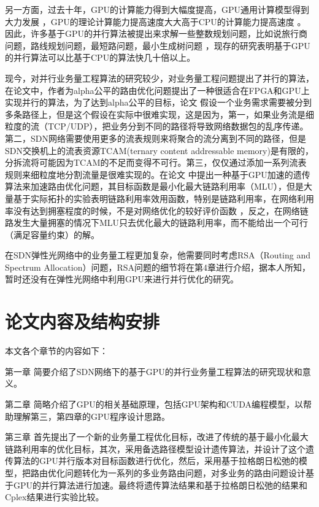 \documentclass[master]{thesis-uestc}
\begin{document}
另一方面，过去十年，GPU的计算能力得到大幅度提高，GPU通用计算模型得到大力发展 ，GPU的理论计算能力提高速度大大高于CPU的计算能力提高速度 。因此，许多基于GPU的并行算法被提出来求解一些整数规划问题，比如说旅行商问题，路线规划问题，最短路问题，最小生成树问题 ，现存的研究表明基于GPU的并行算法可以比基于CPU的算法快几十倍以上。

现今，对并行业务量工程算法的研究较少，对业务量工程问题提出了并行的算法，在论文中，作者为alpha公平的路由优化问题提出了一种很适合在FPGA和GPU上实现并行的算法，为了达到alpha公平的目标，论文 假设一个业务需求需要被分到多条路径上，但是这个假设在实际中很难实现，这是因为，第一，如果业务流是细粒度的流（TCP/UDP），把业务分到不同的路径将导致网络数据包的乱序传递。第二，SDN网络需要使用更多的流表规则来将聚合的流分离到不同的路径，但是SDN交换机上的流表资源TCAM(ternary content addressable memory)是有限的，分拆流将可能因为TCAM的不足而变得不可行。第三，仅仅通过添加一系列流表规则来细粒度地分割流量是很难实现的。在论文 中提出一种基于GPU加速的遗传算法来加速路由优化问题，其目标函数是最小化最大链路利用率（MLU），但是大量基于实际拓扑的实验表明链路利用率效用函数，特别是链路利用率，在网络利用率没有达到拥塞程度的时候，不是对网络优化的较好评价函数 ，反之，在网络链路发生大量拥塞的情况下MLU只去优化最大的链路利用率，而不能给出一个可行（满足容量约束）的解。

在SDN弹性光网络中的业务量工程更加复杂，他需要同时考虑RSA（Routing and Spectrum Allocation）问题，RSA问题的细节将在第4章进行介绍，据本人所知，暂时还没有在弹性光网络中利用GPU来进行并行优化的研究。
\section{论文内容及结构安排}
本文各个章节的内容如下：

第一章 简要介绍了SDN网络下的基于GPU的并行业务量工程算法的研究现状和意义。

第二章 简略介绍了GPU的相关基础原理，包括GPU架构和CUDA编程模型，以帮助理解第三，第四章的GPU程序设计思路。

第三章 首先提出了一个新的业务量工程优化目标，改进了传统的基于最小化最大链路利用率的优化目标，其次，采用备选路径模型设计遗传算法，并设计了这个遗传算法的GPU并行版本对目标函数进行优化，然后，采用基于拉格朗日松弛的模型，把路由优化问题转化为一系列的多业务路由问题，对多业务的路由问题设计基于GPU的并行算法进行加速。最终将遗传算法结果和基于拉格朗日松弛的结果和Cplex结果进行实验比较。
\end{document}
